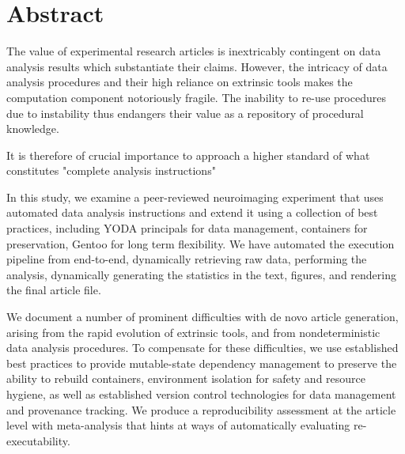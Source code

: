 \section{Abstract}

The value of experimental research articles is inextricably contingent on data analysis results which substantiate their claims.
However, the intricacy of data analysis procedures and their high reliance on extrinsic tools makes the computation component notoriously fragile.
The inability to re-use procedures due to instability thus endangers their value as a repository of procedural knowledge.

It is therefore of crucial importance to approach a higher standard of what constitutes "complete analysis instructions"

In this study, we examine a peer-reviewed neuroimaging experiment that uses automated data analysis instructions and extend it using a collection of best practices, including YODA principals for data management, containers for preservation, Gentoo for long term flexibility.
We have automated the execution pipeline from end-to-end, dynamically retrieving raw data, performing the analysis, dynamically generating the statistics in the text, figures, and rendering the final article file. 

We document a number of prominent difficulties with de novo article generation, arising from the rapid evolution of extrinsic tools, and from nondeterministic data analysis procedures.
To compensate for these difficulties, we use established best practices to provide mutable-state dependency management to preserve the ability to rebuild containers, environment isolation for safety and resource hygiene, as well as established version control technologies for data management and provenance tracking.
We produce a reproducibility assessment at the article level with meta-analysis that hints at ways of automatically evaluating re-executability.

